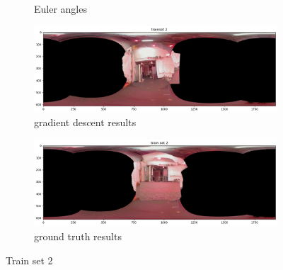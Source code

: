 \documentclass[conference]{IEEEtran}
\begin{document}
\begin{figure}[h]
\begin{subfigure}{0.4\textwidth}
        \caption{Euler angles}
        \label{fig:2ea}
    \end{subfigure}
    \begin{subfigure}{0.4\textwidth}
        \includegraphics[width=\linewidth]{../img/pano_2_gd.png}
        \caption{gradient descent results}
        \label{fig:2p}
    \end{subfigure}
    \begin{subfigure}{0.4\textwidth}
        \includegraphics[width=\linewidth]{../img/pano_2_gt.png}
        \caption{ground truth results}
        \label{fig:2pt}
    \end{subfigure}

    \caption{Train set 2}
    \label{fig:set2}
\end{figure}
\end{document}
